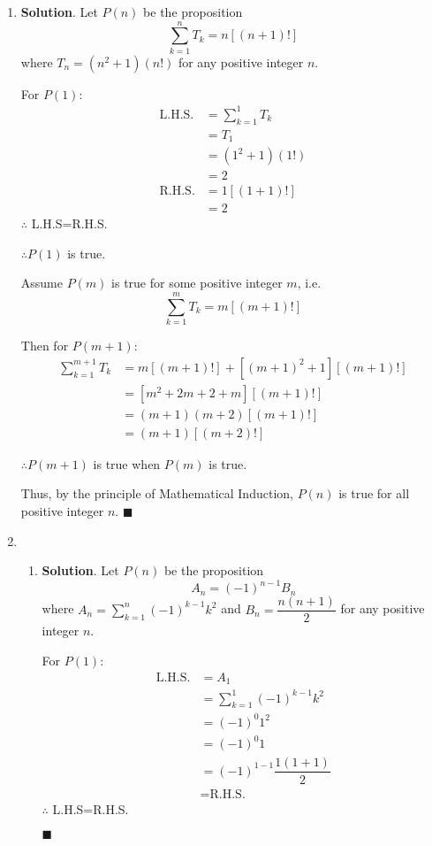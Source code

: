 \documentclass[12pt]{article}
\newenvironment*{sol}{\par \textbf{Solution}.}{\hfill$\blacksquare$}
\begin{document}
    \begin{enumerate}
        \item \begin{sol}
            Let $P(n)$ be the proposition $$\sum_{k=1}^{n}T_k=n[(n+1)!]$$ where $T_n=(n^2+1)(n!)$ for any positive integer $n$.

            For $P(1)$:\begin{align*}
                \textrm{L.H.S.}&=\sum_{k=1}^{1}T_k\\
                &=T_1\\
                &=(1^2+1)(1!)\\
                &=2\\
                \textrm{R.H.S.}&=1[(1+1)!]\\
                &=2
            \end{align*}
            $\therefore$ L.H.S=R.H.S.

            $\therefore P(1)$ is true.
            
            Assume $P(m)$ is true for some positive integer $m$, i.e. $$\sum_{k=1}^{m}T_k=m[(m+1)!]$$

            Then for $P(m+1)$:\begin{align*}
                \sum_{k=1}^{m+1}T_k&=m[(m+1)!]+[(m+1)^2+1][(m+1)!]\\
                &=[m^2+2m+2+m][(m+1)!]\\
                &=(m+1)(m+2)[(m+1)!]\\
                &=(m+1)[(m+2)!]
            \end{align*}

            $\therefore P(m+1)$ is true when $P(m)$ is true.

            Thus, by the principle of Mathematical Induction, $P(n)$ is true for all positive integer $n$.
        \end{sol}
        \item \begin{enumerate}
            \item \begin{sol}
                Let $P(n)$ be the proposition $$A_n=(-1)^{n-1}B_n$$ where $A_n=\sum_{k=1}^{n}(-1)^{k-1}k^2$ and $B_n=\dfrac{n(n+1)}{2}$ for any positive integer $n$.
        
                For $P(1)$:\begin{align*}
                    \textrm{L.H.S.}&=A_1\\
                    &=\sum_{k=1}^{1}(-1)^{k-1}k^2\\
                    &=(-1)^0 1^2\\
                    &=(-1)^0 1\\
                    &=(-1)^{1-1}\dfrac{1(1+1)}{2}\\
                    &=\textrm{R.H.S.}
                \end{align*}
                $\therefore$ L.H.S=R.H.S.
        

\end{sol}
\end{enumerate}
\end{enumerate}
\end{document}
